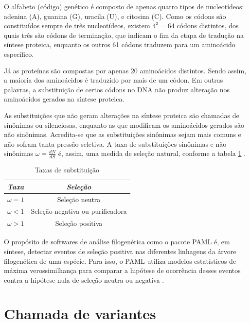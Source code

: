 \documentclass[cic,tc]{iiufrgs}
\begin{document}
O alfabeto (código) genético é composto de apenas quatro tipos de nucleotídeos:
adenina (A), guanina (G), uracila (U), e citosina (C). Como os códons são
constituídos sempre de três nucleotídeos, existem $4^3 = 64$ códons distintos,
dos quais três são códons de terminação, que indicam o fim da etapa de tradução
na síntese proteica, enquanto os outros 61 códons traduzem para um aminoácido
específico.

Já as proteínas são compostas por apenas 20 aminoácidos distintos. Sendo assim,
a maioria dos aminoácidos é traduzido por mais de um códon. Em outras palavras,
a substituição de certos códons no DNA não produz alteração nos aminoácidos
gerados na síntese proteica.

As substituições que não geram alterações na síntese proteica são chamadas de
sinônimas ou silenciosas, enquanto as que modificam os aminoácidos gerados são
não sinônimas. Acredita-se que as substituições sinônimas sejam mais comuns e
não sofram tanta pressão seletiva. A taxa de substituições sinônimas e não
sinônimas $\omega = \frac{dN}{dS}$ é, assim, uma medida de seleção natural,
conforme a tabela \ref{tbl:ex1} \cite{yang2002codon}.

\begin{table}[h]
    \caption{Taxas de substituição}
    \centering
        \begin{tabular}{c|c}
          \hline
          \textit{Taxa}  &   \textit{Seleção} \\
          \hline
          \hline
          $\omega = 1$ & Seleção neutra \\
          $\omega < 1$ & Seleção negativa ou purificadora \\
          $\omega > 1$ & Seleção positiva \\
          \hline
        \end{tabular}
    \label{tbl:ex1}
\end{table}

O propósito de softwares de análise filogenética como o pacote PAML é, em
síntese, detectar eventos de seleção positiva nas diferentes linhagens da
árvore filogenética de uma espécie. Para isso, o PAML utiliza modelos
estatísticos de máxima verossimilhança para comparar a hipótese de ocorrência
desses eventos contra a hipótese nula de seleção neutra ou
negativa \cite{moretti2012gcodeml}.

\section{Chamada de variantes}
\label{sec:call}
\end{document}
